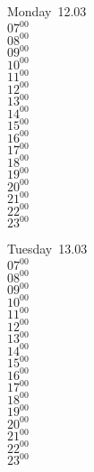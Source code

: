 \documentclass[11pt, a4paper]{book}\usepackage[]{graphicx}\usepackage[]{color}
\begin{document}
\begin{headerbox}
\end{headerbox}
\begin{weekdaybox}
  Monday~12.03\\
  { 
  \vfill
  $07^{00}$\\
$08^{00}$\\
$09^{00}$\\
$10^{00}$\\
$11^{00}$\\
$12^{00}$\\
$13^{00}$\\
$14^{00}$\\
$15^{00}$\\
$16^{00}$\\
$17^{00}$\\
$18^{00}$\\
$19^{00}$\\
$20^{00}$\\
$21^{00}$\\
$22^{00}$\\
$23^{00}$\\
  }
\end{weekdaybox}
\begin{weekdaybox}
  Tuesday~13.03\\
  { 
  \vfill
  $07^{00}$\\
$08^{00}$\\
$09^{00}$\\
$10^{00}$\\
$11^{00}$\\
$12^{00}$\\
$13^{00}$\\
$14^{00}$\\
$15^{00}$\\
$16^{00}$\\
$17^{00}$\\
$18^{00}$\\
$19^{00}$\\
$20^{00}$\\
$21^{00}$\\
$22^{00}$\\
$23^{00}$\\
  }
\end{weekdaybox}
\end{document}
